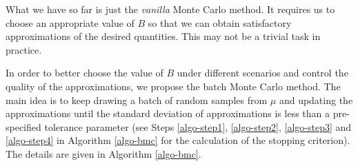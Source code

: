 What we have so far is just the \emph{vanilla} Monte Carlo method. It requires us to choose an appropriate value of $B$ so that we can obtain satisfactory approximations of the desired quantities. This may not be a trivial task in practice. 

In order to better choose the value of $B$ under different scenarios and control the quality of the approximations, we propose the batch Monte Carlo method. The main idea is to keep drawing a batch of random samples from $\mu$ and updating the approximations until the standard deviation of approximations is less than a pre-specified tolerance parameter (see Steps \ref{algo-step1}, \ref{algo-step2}, \ref{algo-step3} and \ref{algo-step4} in Algorithm \ref{algo-bmc} for the calculation of the stopping criterion). The details are given in Algorithm \ref{algo-bmc}. 

